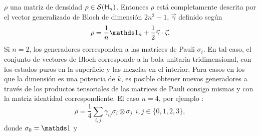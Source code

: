 $\rho$ una matriz de densidad $\rho\in\mathcal{S}({\sf H}_{n})$. Entonces $\rho$ está completamente descrita por el vector generalizado de Bloch de dimensión $2n^{2}-1$, $\vec{\gamma}$ definido según
\begin{equation}
    \rho=\frac{1}{n}\Id_{n}+\frac{1}{2}\vec{\gamma}\cdot\vec{\varsigma}.
\end{equation}
Si $n=2$, los generadores corresponden a las matrices de Pauli $\sigma_{i}$. En tal caso, el conjunto de vectores de Bloch corresponde a la bola unitaria tridimensional, con los estados puros en la superficie y las mezclas en el interior. Para casos en los que la dimensión es una potencia de $k$, es posible obtener nuevos generadores a través de los productos tensoriales de las matrices de Pauli consigo mismas y con la matriz identidad correspondiente. El caso $n=4$, por ejemplo \cite{Chuang}:
\begin{equation}\label{eq::BlochParametrization4}
    \rho=\frac{1}{4}\sum_{i,j}\gamma_{ij}\sigma_{i}\otimes \sigma_{j} \ \ i,j\in\{0,1,2,3\},
\end{equation}
donde $\sigma_{0}=\Id$ y 

